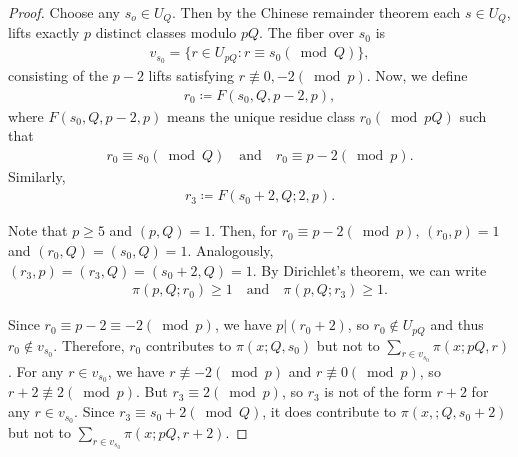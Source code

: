 \documentclass[11pt,reqno]{amsart}
\theoremstyle{plain}\newtheorem{theorem}{Theorem}[section]
\numberwithin{equation}{section}
\begin{document}
\begin{proof}
Choose any $s_o\in U_Q$. Then by the Chinese remainder theorem each $s\in U_Q$, lifts exactly $p$ distinct classes modulo $pQ$. The fiber over $s_0$ is
\begin{align*}
v_{s_0}
=\{r\in U_{pQ}:r\equiv s_0(\bmod{Q})\},
\end{align*}
consisting of the $p-2$ lifts satisfying $r\not\equiv0,-2(\bmod{p})$. Now, we define
\begin{align*}
r_0
\coloneqq F(s_0,Q,p-2,p),
\end{align*}
where $F(s_0,Q,p-2,p)$ means the unique residue class $r_0(\bmod{pQ})$ such that
\begin{align*}
r_0\equiv s_0(\bmod{Q})\quad\text{and}\quad r_0\equiv p-2(\bmod{p}).    
\end{align*}
Similarly, 
\begin{align*}
r_3
\coloneqq F(s_0+2,Q;2,p).
\end{align*}

\noindent
Note that $p\geq5$ and $(p,Q)=1$. Then, for $r_0\equiv p-2(\bmod{p})$, $(r_0,p)=1$ and $(r_0,Q)=(s_0,Q)=1$. Analogously, $(r_3,p)=(r_3,Q)=(s_0+2,Q)=1$. By Dirichlet's theorem, we can write
\begin{align*}
\pi(p,Q;r_0)\geq 1\quad\text{and}\quad
\pi(p,Q;r_3)\geq 1.
\end{align*}

\noindent
Since $r_0\equiv p-2\equiv -2(\bmod{p})$, we have $p|(r_0+2)$, so $r_0\notin U_{pQ}$ and thus $r_0\notin v_{s_0}$. Therefore, $r_0$ contributes to $\pi(x;Q,s_0)$ but not to $\sum_{r\in v_{s_0}}\pi(x;pQ,r)$. For any $r\in v_{s_0}$, we have $r \not\equiv -2(\bmod{p})$ and $r\not\equiv 0(\bmod{p})$, 
so $r+2\not\equiv 2(\bmod{p})$. But $r_3\equiv 2(\bmod{p})$, so $r_3$ is not of the form $r+2$ for any $r\in v_{s_0}$. Since $r_3 \equiv s_0+2(\bmod{Q})$, it does contribute to $\pi(x,;Q,s_0+2)$ but not to $\sum_{r\in v_{s_0}}\pi(x;pQ,r+2)$. 


\end{proof}
\end{document}
